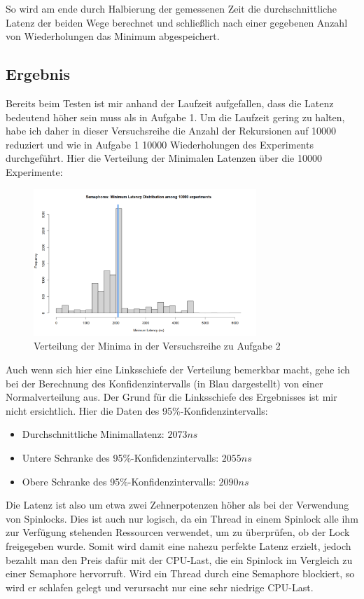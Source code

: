 \documentclass[12pt]{article}
\begin{document}
So wird am ende durch Halbierung der gemessenen Zeit die durchschnittliche Latenz der beiden Wege berechnet und schließlich nach einer gegebenen Anzahl von Wiederholungen das Minimum abgespeichert.

\subsection{Ergebnis}
Bereits beim Testen ist mir anhand der Laufzeit aufgefallen, dass die Latenz bedeutend höher sein muss als in Aufgabe 1.
Um die Laufzeit gering zu halten, habe ich daher in dieser Versuchsreihe die Anzahl der Rekursionen auf 10000 reduziert und wie in Aufgabe 1 10000 Wiederholungen des Experiments durchgeführt.
Hier die Verteilung der Minimalen Latenzen über die 10000 Experimente:

\begin{figure}[H]
	\centering
	\includegraphics[width=0.75\textwidth]{./img/semaphores}
	\caption{Verteilung der Minima in der Versuchsreihe zu Aufgabe 2}
	\label{img:semaphore}
\end{figure}

Auch wenn sich hier eine Linksschiefe der Verteilung bemerkbar macht, gehe ich bei der Berechnung des Konfidenzintervalls (in Blau dargestellt) von einer Normalverteilung aus.
Der Grund für die Linksschiefe des Ergebnisses ist mir nicht ersichtlich.
Hier die Daten des 95\%-Konfidenzintervalls:
\begin{itemize}
	\item Durchschnittliche Minimallatenz: $2073 ns$
	\item Untere Schranke des 95\%-Konfidenzintervalls: $2055 ns$
	\item Obere Schranke des 95\%-Konfidenzintervalls: $2090 ns$
\end{itemize}

Die Latenz ist also um etwa zwei Zehnerpotenzen höher als bei der Verwendung von Spinlocks.
Dies ist auch nur logisch, da ein Thread in einem Spinlock alle ihm zur Verfügung stehenden Ressourcen verwendet, um zu überprüfen, ob der Lock freigegeben wurde.
Somit wird damit eine nahezu perfekte Latenz erzielt, jedoch bezahlt man den Preis dafür mit der CPU-Last, die ein Spinlock im Vergleich zu einer Semaphore hervorruft.
Wird ein Thread durch eine Semaphore blockiert, so wird er schlafen gelegt und verursacht nur eine sehr niedrige CPU-Last.
\end{document}
